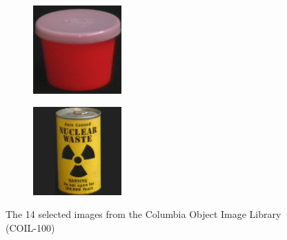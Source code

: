 \begin{figure}[tbp]
\begin{subfigure}{80pt}
    \caption{}
	\end{subfigure}
	\begin{subfigure}{80pt}
        \centering
    \includegraphics[width=\textwidth]{figures/coil_original/95.png}
    \caption{}
	\end{subfigure}
	\begin{subfigure}{80pt}
        \centering
    \includegraphics[width=\textwidth]{figures/coil_original/99.png}
    \caption{}
    \end{subfigure}
	\caption{The 14 selected images from the Columbia Object Image Library (COIL-100)}
	\label{fig:coil_original}
\end{figure}

